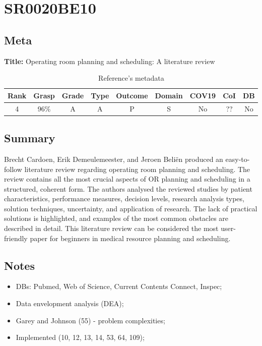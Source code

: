 \section{ SR0020BE10 }


\subsection{Meta}

    \textbf{Title:}
    Operating room planning and scheduling: A literature review

    \begin{table}[H]
        \centering
        \begin{tabular}{|c|c|c|c|c|c|c|c|c|}
            \hline
                \textbf{Rank} & \textbf{Grasp} & \textbf{Grade} & \textbf{Type} & \textbf{Outcome} & \textbf{Domain} & \textbf{COV19} & \textbf{CoI} & \textbf{DB} \\
            \hline
                4 & 96\% & A & A & P & S & No & ?? & No \\
            \hline
        \end{tabular}
        \caption{Reference's metadata}
        \label{tab:SR0020BE10}
    \end{table}

\subsection{Summary}
    Brecht Cardoen, Erik Demeulemeester, and Jeroen Beliën \cite{x228} produced an easy-to-follow literature review regarding operating room planning and scheduling. The review contains all the most crucial aspects of OR planning and scheduling in a structured, coherent form. The authors analysed the reviewed studies by patient characteristics, performance measures, decision levels, research analysis types, solution techniques, uncertainty, and application of research. The lack of practical solutions is highlighted, and examples of the most common obstacles are described in detail. This literature review can be considered the most user-friendly paper for beginners in medical resource planning and scheduling.

\subsection{Notes}
    \begin{itemize}
        \item DBs: Pubmed, Web of Science, Current Contents Connect, Inspec;
        \item Data envelopment analysis (DEA);
        \item Garey and Johnson (55) - problem complexities;
        \item Implemented (10, 12, 13, 14, 53, 64, 109);
    \end{itemize}


